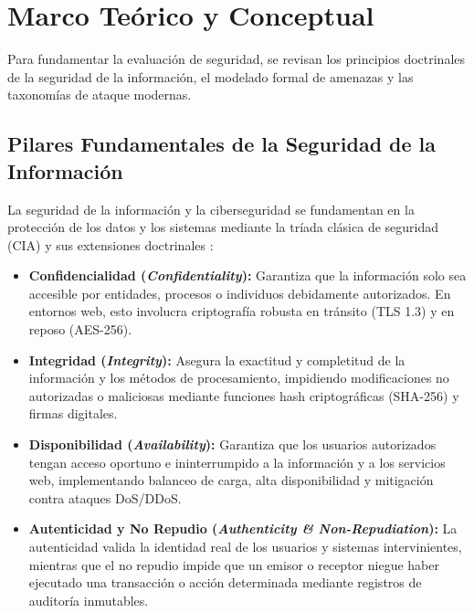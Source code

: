\chapter{Marco Teórico y Conceptual}
\label{ch:marco_teorico}

Para fundamentar la evaluación de seguridad, se revisan los principios doctrinales de la seguridad de la información, el modelado formal de amenazas y las taxonomías de ataque modernas.

\section{Pilares Fundamentales de la Seguridad de la Información}
La seguridad de la información y la ciberseguridad se fundamentan en la protección de los datos y los sistemas mediante la tríada clásica de seguridad (CIA) y sus extensiones doctrinales \citep{stallings2018cryptography}:
\begin{itemize}
    \item \textbf{Confidencialidad (\textit{Confidentiality}):} Garantiza que la información solo sea accesible por entidades, procesos o individuos debidamente autorizados. En entornos web, esto involucra criptografía robusta en tránsito (TLS 1.3) y en reposo (AES-256).
    \item \textbf{Integridad (\textit{Integrity}):} Asegura la exactitud y completitud de la información y los métodos de procesamiento, impidiendo modificaciones no autorizadas o maliciosas mediante funciones hash criptográficas (SHA-256) y firmas digitales.
    \item \textbf{Disponibilidad (\textit{Availability}):} Garantiza que los usuarios autorizados tengan acceso oportuno e ininterrumpido a la información y a los servicios web, implementando balanceo de carga, alta disponibilidad y mitigación contra ataques DoS/DDoS.
    \item \textbf{Autenticidad y No Repudio (\textit{Authenticity \& Non-Repudiation}):} La autenticidad valida la identidad real de los usuarios y sistemas intervinientes, mientras que el no repudio impide que un emisor o receptor niegue haber ejecutado una transacción o acción determinada mediante registros de auditoría inmutables.
\end{itemize}

